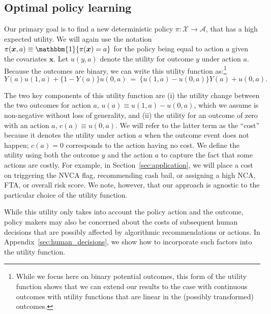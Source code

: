 \documentclass[12pt]{article}
\theoremstyle{definition}
\newcommand{\bbone}{\ensuremath{\mathbbm{1}}}
\newcommand{\bx}{\bm x}
\newcommand{\<}{\langle}
\renewcommand{\>}{\rangle}
\newcommand\mcal[1]{\ensuremath{\mathcal{#1}}}
\begin{document}
\subsection{Optimal policy learning}
\label{sec:opt_pol_learn}

Our primary goal is to find a new deterministic policy
$\pi:\mcal{X} \to \mathcal{A}$, that has a high expected utility.  We
will again use the notation $\pi(\bx, a) \equiv \bbone\{\pi(\bx) = a\}$
for the policy being equal to action $a$ given the covariates $\bx$.
Let $u(y, a)$ denote the utility for outcome $y$ under action $a$.
Because the outcomes are binary, we can write this utility function
as:\footnote{While we focus here on binary potential outcomes, this
  form of the utility function shows that we can extend our results to
  the case with continuous outcomes with utility functions that are
  linear in the (possibly transformed) outcomes. }
\begin{equation*}
  Y(a)u(1,a) + \{1 - Y(a)\}u(0,a) \ = \ \{u(1,a) - u(0,a)\}Y(a) + u(0,a).
\end{equation*}

The two key components of this utility function are (i) the utility
change between the two outcomes for action $a$,
$u(a) \equiv u(1,a) - u(0,a)$, which we assume is non-negative without
loss of generality, and (ii) the utility for an outcome of zero with
an action $a$, $c(a) \equiv u(0,a)$. We will refer to the latter term
as the ``cost'' because it denotes the utility under action $a$ when
the outcome event does not happen; $c(a)=0$ corresponds to the action
having no cost.  We define the utility using both the outcome
$y$ and the action $a$ to capture the fact that some actions are
costly. For example, in Section~\ref{sec:application}, we will place a
cost on triggering the NVCA flag, recommending cash bail, or assigning
a high NCA, FTA, or overall risk score.
We note, however, that our approach is agnostic to the particular choice
of the utility function.

While this utility only takes into account the policy action and the
outcome, policy makers may also be concerned about the costs of
subsequent human decisions that are possibly affected by algorithmic
recommendations or actions. In Appendix~\ref{sec:human_decisions}, we
show how to incorporate such factors into the utility function.
\end{document}
